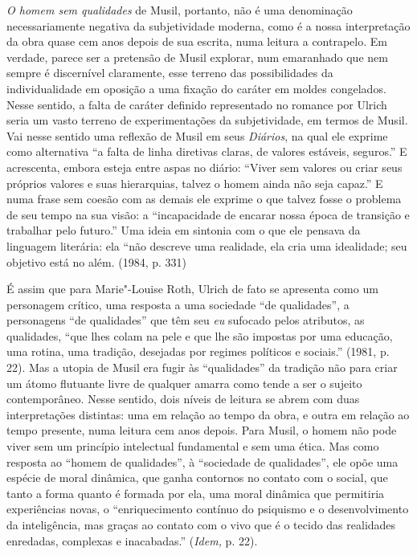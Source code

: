 \emph{O homem sem qualidades} de Musil, portanto, não é uma denominação
necessariamente negativa da subjetividade moderna, como é a nossa
interpretação da obra quase cem anos depois de sua escrita, numa leitura
a contrapelo. Em verdade, parece ser a pretensão de Musil explorar, num
emaranhado que nem sempre é discernível claramente, esse terreno das
possibilidades da individualidade em oposição a uma fixação do caráter
em moldes congelados. Nesse sentido, a falta de caráter definido
representado no romance por Ulrich seria um vasto terreno de
experimentações da subjetividade, em termos de Musil. Vai nesse sentido
uma reflexão de Musil em seus \emph{Diários}, na qual ele exprime como
alternativa ``a falta de linha diretivas claras, de valores estáveis,
seguros.'' E acrescenta, embora esteja entre aspas no diário: ``Viver
sem valores ou criar seus próprios valores e suas hierarquias, talvez o
homem ainda não seja capaz.'' E numa frase sem coesão com as demais ele
exprime o que talvez fosse o problema de seu tempo na sua visão: a
``incapacidade de encarar nossa época de transição e trabalhar pelo
futuro.'' Uma ideia em sintonia com o que ele pensava da linguagem
literária: ela ``não descreve uma realidade, ela cria uma idealidade;
seu objetivo está no além. (1984, p. 331)

É assim que para Marie"-Louise Roth, Ulrich de fato se apresenta como um
personagem crítico, uma resposta a uma sociedade ``de qualidades'', a
personagens ``de qualidades'' que têm seu \emph{eu} sufocado pelos
atributos, as qualidades, ``que lhes colam na pele e que lhe são
impostas por uma educação, uma rotina, uma tradição, desejadas por
regimes políticos e sociais.'' (1981, p. 22). Mas a utopia de Musil era
fugir às ``qualidades'' da tradição não para criar um átomo flutuante
livre de qualquer amarra como tende a ser o sujeito contemporâneo.
Nesse sentido, dois níveis de leitura se abrem com duas interpretações
distintas: uma em relação ao tempo da obra, e outra em relação ao tempo
presente, numa leitura cem anos depois. Para Musil, o homem não pode
viver sem um princípio intelectual fundamental e sem uma ética. Mas como
resposta ao ``homem de qualidades'', à ``sociedade de qualidades'', ele
opõe uma espécie de moral dinâmica, que ganha contornos no contato com o
social, que tanto a forma quanto é formada por ela, uma moral dinâmica
que permitiria experiências novas, o ``enriquecimento contínuo do
psiquismo e o desenvolvimento da inteligência, mas graças ao contato com
o vivo que é o tecido das realidades enredadas, complexas e
inacabadas.'' (\emph{Idem,} p. 22).

